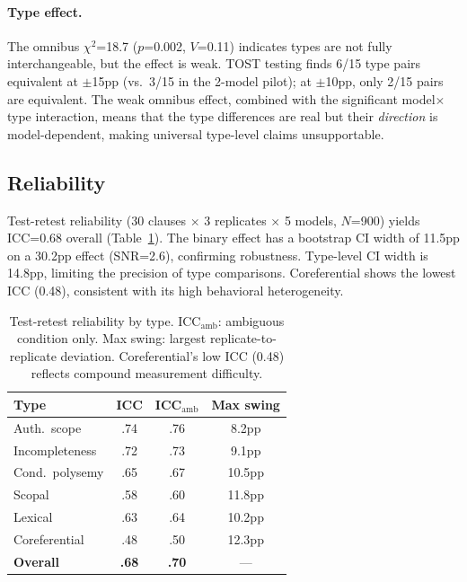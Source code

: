 \documentclass[11pt]{article}
\begin{document}
\paragraph{Type effect.} The omnibus $\chi^2$=18.7 ($p$=0.002, $V$=0.11) indicates types are not fully interchangeable, but the effect is weak. TOST testing finds 6/15 type pairs equivalent at $\pm$15pp (vs.\ 3/15 in the 2-model pilot); at $\pm$10pp, only 2/15 pairs are equivalent. The weak omnibus effect, combined with the significant model$\times$type interaction, means that the type differences are real but their \emph{direction} is model-dependent, making universal type-level claims unsupportable.

\subsection{Reliability}

Test-retest reliability (30 clauses $\times$ 3 replicates $\times$ 5 models, $N$=900) yields ICC=0.68 overall (Table~\ref{tab:icc}). The binary effect has a bootstrap CI width of 11.5pp on a 30.2pp effect (SNR=2.6), confirming robustness. Type-level CI width is 14.8pp, limiting the precision of type comparisons. Coreferential shows the lowest ICC (0.48), consistent with its high behavioral heterogeneity.

\begin{table}[t]
\centering
\small
\begin{tabular}{lccc}
\toprule
\textbf{Type} & \textbf{ICC} & \textbf{ICC$_{\text{amb}}$} & \textbf{Max swing} \\
\midrule
Auth.\ scope & .74 & .76 & 8.2pp \\
Incompleteness & .72 & .73 & 9.1pp \\
Cond.\ polysemy & .65 & .67 & 10.5pp \\
Scopal & .58 & .60 & 11.8pp \\
Lexical & .63 & .64 & 10.2pp \\
Coreferential & .48 & .50 & 12.3pp \\
\midrule
\textbf{Overall} & \textbf{.68} & \textbf{.70} & --- \\
\bottomrule
\end{tabular}
\caption{Test-retest reliability by type. ICC$_{\text{amb}}$: ambiguous condition only. Max swing: largest replicate-to-replicate deviation. Coreferential's low ICC (0.48) reflects compound measurement difficulty.}
\label{tab:icc}
\end{table}
\end{document}

